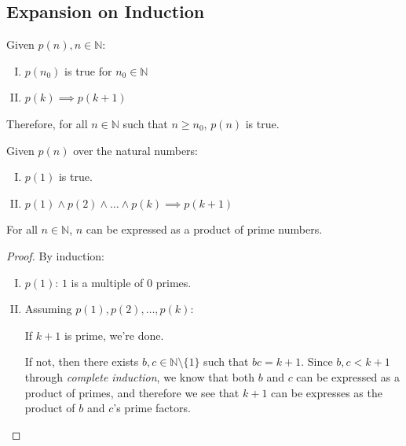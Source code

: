 \documentclass[00_complete]{subfiles}
\begin{document}
\subsection{Expansion on Induction}
\setcounter{example}{0}
\begin{theorem}
    Given $p(n), n \in \mathbb{N}$:
    \begin{enumerate}[I.]
        \item $p(n_0)$ is true for $n_0 \in \mathbb{N}$
        \item $p(k)\implies p(k+1)$
    \end{enumerate}
    Therefore, for all $n \in \mathbb{N}$ such that $n \geq n_0$, $p(n)$ is
    true.
\end{theorem}
\begin{theorem}
    Given $p(n)$ over the natural numbers:
    \begin{enumerate}[I.]
        \item $p(1)$ is true.
        \item $p(1)\land p(2) \land \dots \land p(k) \implies p(k+1)$
    \end{enumerate}
\end{theorem}
\begin{example}
    For all $n \in \mathbb{N}$, $n$ can be expressed as a product of prime
    numbers.
    \begin{proof}
    By induction:
        \begin{enumerate}[I.]
            \item $p(1)$: $1$ is a multiple of $0$ primes.
            \item Assuming $p(1), p(2), \dots, p(k)$:

                If $k+1$ is prime, we're done.

                If not, then there exists $b,c \in \mathbb{N} \setminus \{1\}$
                such that $bc=k+1$. Since $b,c < k+1$ through \emph{complete
                induction}, we know that both $b$ and $c$ can be expressed as a
                product of primes, and therefore we see that $k+1$ can be
                expresses as the product of $b$ and $c$'s prime factors.
        \end{enumerate}
    \end{proof}
\end{example}
\end{document}
